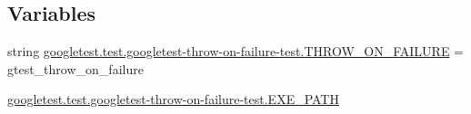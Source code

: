 \subsection*{Variables}
\begin{DoxyCompactItemize}
\item 
string \mbox{\hyperlink{namespacegoogletest_1_1test_1_1googletest-throw-on-failure-test_aaaed5791930e06626fad979c1c3becce}{googletest.\+test.\+googletest-\/throw-\/on-\/failure-\/test.\+T\+H\+R\+O\+W\+\_\+\+O\+N\+\_\+\+F\+A\+I\+L\+U\+RE}} = \textquotesingle{}gtest\+\_\+throw\+\_\+on\+\_\+failure\textquotesingle{}
\item 
\mbox{\hyperlink{namespacegoogletest_1_1test_1_1googletest-throw-on-failure-test_ad7269f0f1980cc8f1c5831cfb436b6d2}{googletest.\+test.\+googletest-\/throw-\/on-\/failure-\/test.\+E\+X\+E\+\_\+\+P\+A\+TH}}
\end{DoxyCompactItemize}
